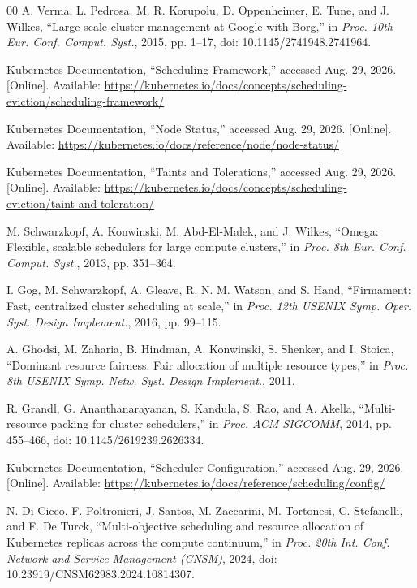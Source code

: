 \documentclass[conference]{IEEEtran}
\begin{document}

\begin{thebibliography}{00}
A. Verma, L. Pedrosa, M. R. Korupolu, D. Oppenheimer, E. Tune, and J. Wilkes,
``Large-scale cluster management at Google with Borg,''
in \emph{Proc. 10th Eur. Conf. Comput. Syst.}, 2015, pp. 1--17,
doi: 10.1145/2741948.2741964.

Kubernetes Documentation, ``Scheduling Framework,'' accessed Aug. 29, 2026.
[Online]. Available: \url{https://kubernetes.io/docs/concepts/scheduling-eviction/scheduling-framework/}

Kubernetes Documentation,
``Node Status,''
accessed Aug. 29, 2026.
[Online]. Available: \url{https://kubernetes.io/docs/reference/node/node-status/}

Kubernetes Documentation,
``Taints and Tolerations,''
accessed Aug. 29, 2026.
[Online]. Available: \url{https://kubernetes.io/docs/concepts/scheduling-eviction/taint-and-toleration/}

M. Schwarzkopf, A. Konwinski, M. Abd-El-Malek, and J. Wilkes,
``Omega: Flexible, scalable schedulers for large compute clusters,''
in \emph{Proc. 8th Eur. Conf. Comput. Syst.}, 2013, pp. 351--364.

I. Gog, M. Schwarzkopf, A. Gleave, R. N. M. Watson, and S. Hand,
``Firmament: Fast, centralized cluster scheduling at scale,''
in \emph{Proc. 12th USENIX Symp. Oper. Syst. Design Implement.},
2016, pp. 99--115.

A. Ghodsi, M. Zaharia, B. Hindman, A. Konwinski, S. Shenker, and I. Stoica,
``Dominant resource fairness: Fair allocation of multiple resource types,''
in \emph{Proc. 8th USENIX Symp. Netw. Syst. Design Implement.}, 2011.

R. Grandl, G. Ananthanarayanan, S. Kandula, S. Rao, and A. Akella,
``Multi-resource packing for cluster schedulers,''
in \emph{Proc. ACM SIGCOMM}, 2014, pp. 455--466,
doi: 10.1145/2619239.2626334.

Kubernetes Documentation, ``Scheduler Configuration,'' accessed Aug. 29, 2026.
[Online]. Available: \url{https://kubernetes.io/docs/reference/scheduling/config/}

N. Di Cicco, F. Poltronieri, J. Santos, M. Zaccarini, M. Tortonesi,
C. Stefanelli, and F. De Turck,
``Multi-objective scheduling and resource allocation of Kubernetes replicas
across the compute continuum,'' in \emph{Proc. 20th Int. Conf. Network and
Service Management (CNSM)}, 2024,
doi: 10.23919/CNSM62983.2024.10814307.


\end{thebibliography}
\end{document}
